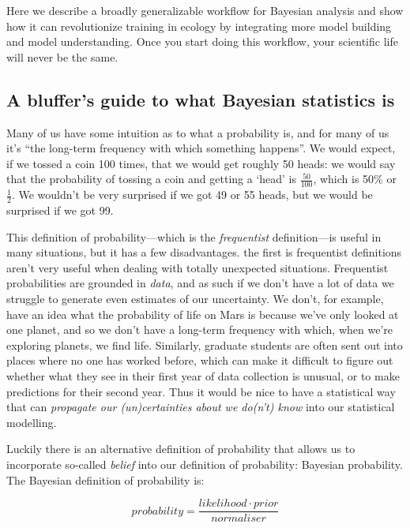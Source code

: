 \documentclass[11pt]{article}
\begin{document}
{Here we describe a broadly generalizable workflow for Bayesian analysis and show how it can revolutionize training in ecology by integrating more model building and model understanding. Once you start doing this workflow, your scientific life will never be the same. 

\subsection{A bluffer's guide to what Bayesian statistics is}
Many of us have some intuition as to what a probability is, and for many of us it's ``the long-term frequency with which something happens''. We would expect, if we tossed a coin 100 times, that we would get roughly 50 heads: we would say that the probability of tossing a coin and getting a `head' is $\frac{50}{100}$, which is 50\% or $\frac{1}{2}$. We wouldn't be very surprised if we got 49 or 55 heads, but we would be surprised if we got 99.

This definition of probability---which is the \emph{frequentist} definition---is useful in many situations, but it has a few disadvantages. the first is frequentist definitions aren't very useful when dealing with totally unexpected situations. Frequentist probabilities are grounded in \emph{data}, and as such if we don't have a lot of data we struggle to generate even estimates of our uncertainty. We don't, for example, have an idea what the probability of life on Mars is because we've only looked at one planet, and so we don't have a long-term frequency with which, when we're exploring planets, we find life. Similarly, graduate students are often sent out into places where no one has worked before, which can make it difficult to figure out whether what they see in their first year of data collection is unusual, or to make predictions for their second year. Thus it would be nice to have a statistical way that can \emph{propagate our (un)certainties about we do(n't) know} into our statistical modelling.

Luckily there is an alternative definition of probability that allows us to incorporate so-called \emph{belief} into our definition of probability: Bayesian probability. The Bayesian definition of probability is:

\begin{equation}
  probability = \frac{likelihood \cdot prior}{normaliser}
  \label{bayes_theorem}
\end{equation}

}
\end{document}
